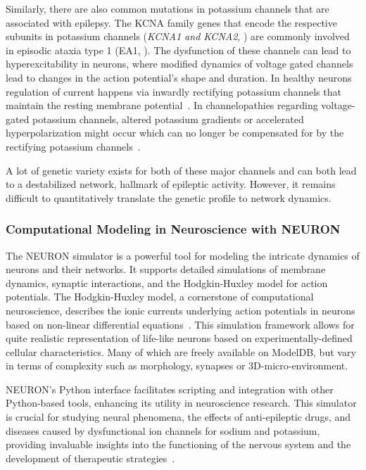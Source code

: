 Similarly, there are also common mutations in potassium channels that are associated with epilepsy.
The KCNA family genes that encode the respective subunits in potassium channels (\textit{KCNA1 and KCNA2}, \textcite{gaoPotassiumChannelsEpilepsy2022})
are commonly involved in episodic ataxia type 1 (EA1, \textcite{gravesIonChannelsEpilepsy2006}).
The dysfunction of these channels can lead to hyperexcitability in neurons, where modified dynamics of voltage gated channels lead to changes in the action potential's shape and duration.
In healthy neurons regulation of current happens via inwardly rectifying potassium channels that maintain the resting membrane potential~\parencite{isomotoInwardlyRectifyingPotassium1997}.
In channelopathies regarding voltage-gated potassium channels, altered potassium gradients or accelerated hyperpolarization might occur which can no longer be compensated for by the rectifying
potassium channels~\parencite{nikitinPotassiumChannelsProminent2021}.

A lot of genetic variety exists for both of these major channels and can both lead to a destabilized network, hallmark of epileptic activity.
However, it remains difficult to quantitatively translate the genetic profile to network dynamics.

\subsubsection{Computational Modeling in Neuroscience with NEURON}
The NEURON simulator is a powerful tool for modeling the intricate dynamics
of neurons and their networks. It supports detailed simulations of membrane
dynamics, synaptic interactions, and the Hodgkin-Huxley model for action
potentials. The Hodgkin-Huxley model, a cornerstone of computational neuroscience,
describes the ionic currents underlying action potentials in neurons based
on non-linear differential equations~\parencite{hodgkinMeasurementCurrentvoltageRelations1952}.
This simulation framework allows for quite realistic representation of life-like neurons based
on experimentally-defined cellular characteristics. Many of which are freely available on ModelDB,
but vary in terms of complexity such as morphology, synapses or 3D-micro-environment.

NEURON's Python interface facilitates scripting and integration
with other Python-based tools, enhancing its utility in neuroscience research.
This simulator is crucial for studying neural phenomena, the effects of
anti-epileptic drugs, and diseases caused by dysfunctional ion channels for sodium and potassium,
providing invaluable insights into the functioning of the nervous system
and the development of therapeutic strategies~\parencite{miglioreParallelNetworkSimulations2006}.
\pagebreak
